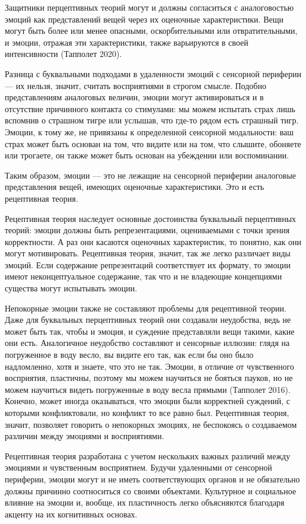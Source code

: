 \documentclass[11pt]{book}
\begin{document}
Защитники перцептивных теорий могут и должны согласиться с аналоговостью эмоций как представлений вещей через их оценочные характеристики. Вещи могут быть более или менее опасными, оскорбительными или отвратительными, и эмоции, отражая эти характеристики, также варьируются в своей интенсивности (Тапполет 2020).

Разница с буквальными подходами в удаленности эмоций с сенсорной периферии --- их нельзя, значит, считать восприятиями в строгом смысле. Подобно представлениям аналоговых величин, эмоции могут активироваться и в отсутствие причинного контакта со стимулами: мы можем испытать страх лишь вспомнив о страшном тигре или услышав, что где-то рядом есть страшный тигр. Эмоции, к тому же, не привязаны к определенной сенсорной модальности: ваш страх может быть основан на том, что видите или на том, что слышите, обоняете или трогаете, он также может быть основан на убеждении или воспоминании.

Таким образом, эмоции --- это не лежащие на сенсорной периферии аналоговые представления вещей, имеющих оценочные характеристики. Это и есть рецептивная теория.

Рецептивная теория наследует основные достоинства буквальный перцептивных теорий: эмоции должны быть репрезентациями, оцениваемыми с точки зрения корректности. А раз они касаются оценочных характеристик, то понятно, как они могут мотивировать. Рецептивная теория, значит, так же легко различает виды эмоций. Если содержание репрезентаций соответствует их формату, то эмоции имеют неконцептуальное содержание, так что и не владеющие концепциями существа могут испытывать эмоции.

Непокорные эмоции также не составляют проблемы для рецептивной теории. Даже для буквальных перцептивных теорий они создавали неудобства, ведь не может быть так, чтобы и эмоция, и суждение представляли вещи такими, какие они есть. Аналогичное неудобство составляют и сенсорные иллюзии: глядя на погруженное в воду весло, вы видите его так, как если бы оно было надломленно, хотя и знаете, что это не так. Эмоции, в отличие от чувственного восприятия, пластичны, поэтому мы можем научиться не бояться пауков, но не можем научиться видеть погруженные в воду весла прямыми (Тапполет 2016). Конечно, может иногда оказываться, что эмоции были корректней суждений, с которыми конфликтовали, но конфликт то все равно был. Рецептивная теория, значит, позволяет говорить о непокорных эмоциях, не беспокоясь о создаваемом различии между эмоциями и восприятиями.

Рецептивная теория разработана с учетом нескольких важных различий между эмоциями и чувственным восприятием. Будучи удаленными от сенсорной периферии, эмоции могут и не иметь соответствующих органов и не обязательно должны причинно соотноситься со своими объектами. Культурное и социальное влияние на эмоции и, вообще, их пластичность легко объясняются благодаря акценту на их когнитивных основах.
\end{document}
